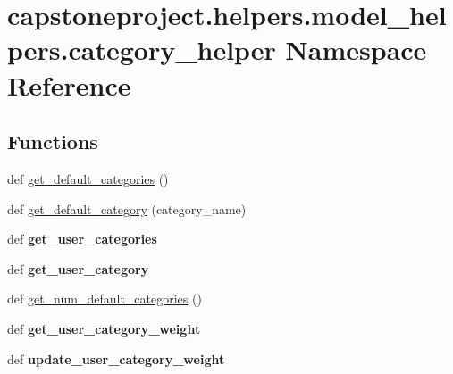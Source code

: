 \hypertarget{namespacecapstoneproject_1_1helpers_1_1model__helpers_1_1category__helper}{}\section{capstoneproject.\+helpers.\+model\+\_\+helpers.\+category\+\_\+helper Namespace Reference}
\label{namespacecapstoneproject_1_1helpers_1_1model__helpers_1_1category__helper}
\subsection*{Functions}
\begin{DoxyCompactItemize}
\item 
def \mbox{\hyperlink{namespacecapstoneproject_1_1helpers_1_1model__helpers_1_1category__helper_a11c0e1c8ca950d53e5e801322d11591e}{get\+\_\+default\+\_\+categories}} ()
\item 
def \mbox{\hyperlink{namespacecapstoneproject_1_1helpers_1_1model__helpers_1_1category__helper_a7164fbd92d4b657c5236f23203cf92df}{get\+\_\+default\+\_\+category}} (category\+\_\+name)
\item 
\mbox{\label{namespacecapstoneproject_1_1helpers_1_1model__helpers_1_1category__helper_a41b9c4a557d7eacfb98771cd04d9c977}} 
def {\bfseries get\+\_\+user\+\_\+categories}
\item 
\mbox{\label{namespacecapstoneproject_1_1helpers_1_1model__helpers_1_1category__helper_aefe7691b7546387caa2b125288ff7513}} 
def {\bfseries get\+\_\+user\+\_\+category}
\item 
def \mbox{\hyperlink{namespacecapstoneproject_1_1helpers_1_1model__helpers_1_1category__helper_a89b339524f94e2d1b579f03601c9c37e}{get\+\_\+num\+\_\+default\+\_\+categories}} ()
\item 
\mbox{\label{namespacecapstoneproject_1_1helpers_1_1model__helpers_1_1category__helper_a206aef56272903cf84f90f6d6716e97d}} 
def {\bfseries get\+\_\+user\+\_\+category\+\_\+weight}
\item 
\mbox{\label{namespacecapstoneproject_1_1helpers_1_1model__helpers_1_1category__helper_aa32e2bc1627692a7363c391bee2ccf3c}} 
def {\bfseries update\+\_\+user\+\_\+category\+\_\+weight}
\end{DoxyCompactItemize}


